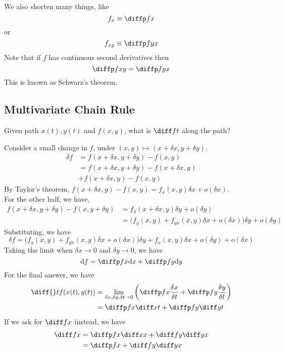 \documentclass[12pt]{article}
\begin{document}
We also shorten many things, like
\[
    f_x \equiv \diffp f x
\]
or
\[
    f_{xy} \equiv \diffp f{yx}
\]
Note that if $f$ has continuous second derivatives then
\[
    \diffp f{xy} = \diffp f{yx}
\]
This is known as Schwarz's theorem.

\subsection{Multivariate Chain Rule}

Given path $x(t),y(t)$ and $f(x,y)$,
what is $\diff ft$ along the path?

Consider a small change in $f$, under $(x,y) \mapsto (x + \delta x, y+\delta y)$.
\begin{align*}
    \delta f &= f(x + \delta x, y + \delta y) - f(x,y)\\
             &= f(x + \delta x, y + \delta y) - f(x + \delta x,y)\\
             &+ f(x + \delta x, y)  - f(x,y)
\end{align*}
By Taylor's theorem, $f(x+\delta x,y) - f(x,y) = f_x(x,y)\delta x + o(\delta x)$.\\
For the other half, we have, 
\begin{align*}
    f(x+\delta x,y + \delta y) - f(x,y + \delta y) 
    &= f_y(x + \delta x,y)\delta y + o(\delta y)\\
    &= \biggl(f_y(x,y) + f_{yx}(x, y)\delta x + o(\delta x)\biggr)\delta y + o(\delta y)
\end{align*}
Substituting, we have
\[
    \delta f = \biggl(f_y(x,y) + f_{yx}(x,y)\delta x + o(\delta x)\biggr)\delta y
    + f_x(x,y)\delta x + o(\delta y) + o(\delta x)
\]
Taking the limit when $\delta x \to 0$ and $\delta y \to 0$, we have
\[
    \mathrm{d} f = \diffp f x \mathrm{d} x + \diffp f y \mathrm{d} y
\]
For the final answer, we have
\begin{align*}
    \diff{}t f(x(t),y(t)) 
    &= \lim_{\delta x,\delta y,\delta t\to 0} 
    \left(\diffp f x \frac{\delta x}{\delta t} + \diffp f y \frac{\delta y}{\delta t}\right)\\
    &= \diffp f x \diff x t + \diffp f y \diff y t
\end{align*}
If we ask for $\diff f x$ instead, we have
\begin{align*}
    \diff fx &= \diffp f x \diff x x + \diff fy \diff yx\\
             &= \diffp fx + \diff fy \diff yx
\end{align*}
\end{document}
